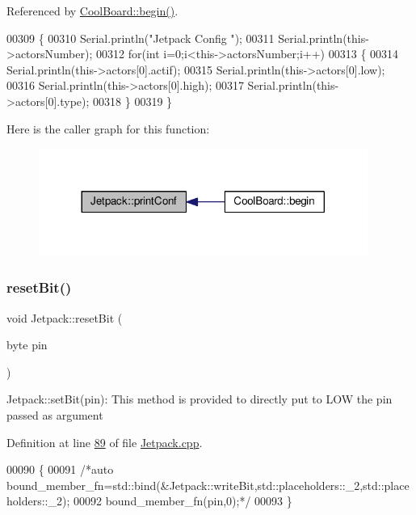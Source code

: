 Referenced by \hyperlink{_cool_board_8cpp_source_l00021}{Cool\+Board\+::begin()}.


\begin{DoxyCode}
00309 \{
00310     Serial.println(\textcolor{stringliteral}{"Jetpack Config "});
00311     Serial.println(this->actorsNumber); 
00312         \textcolor{keywordflow}{for}(\textcolor{keywordtype}{int} i=0;i<this->actorsNumber;i++)
00313     \{
00314     Serial.println(this->actors[0].actif);
00315     Serial.println(this->actors[0].low);
00316     Serial.println(this->actors[0].high);
00317     Serial.println(this->actors[0].type); 
00318     \}
00319 \}
\end{DoxyCode}
Here is the caller graph for this function\+:\nopagebreak
\begin{figure}[H]
\begin{center}
\leavevmode
\includegraphics[width=305pt]{class_jetpack_ac54a7bb4f9166bee32052253d9b1d306_icgraph}
\end{center}
\end{figure}
\mbox{\label{class_jetpack_ad1142aa8d4d8d0528566a5dc1fe85d54}} 
\subsubsection{\texorpdfstring{reset\+Bit()}{resetBit()}}
{\footnotesize\ttfamily void Jetpack\+::reset\+Bit (\begin{DoxyParamCaption}\item[{byte}]{pin }\end{DoxyParamCaption})\hspace{0.3cm}{\ttfamily [static]}}

Jetpack\+::set\+Bit(pin)\+: This method is provided to directly put to L\+OW the pin passed as argument 

Definition at line \hyperlink{_jetpack_8cpp_source_l00089}{89} of file \hyperlink{_jetpack_8cpp_source}{Jetpack.\+cpp}.


\begin{DoxyCode}
00090 \{
00091     \textcolor{comment}{/*auto bound\_member\_fn=std::bind(&Jetpack::writeBit,std::placeholders::\_2,std::placeholders::\_2);}
00092 \textcolor{comment}{    bound\_member\_fn(pin,0);*/}
00093 \}
\end{DoxyCode}
\mbox{\label{class_jetpack_a910c9023313d3896fd71a8a55dceeaa2}} 
